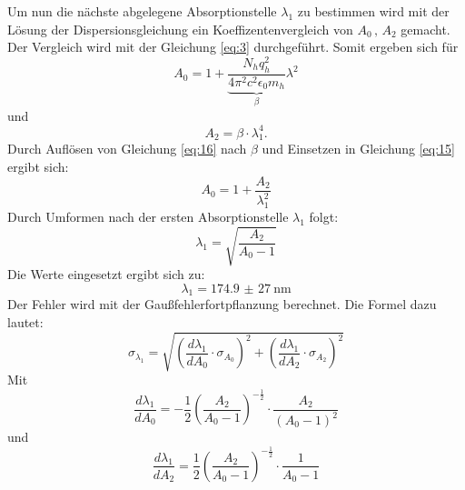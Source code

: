 Um nun die nächste abgelegene Absorptionstelle $\lambda_1$ zu bestimmen wird
mit der Lösung der Dispersionsgleichung ein Koeffizentenvergleich von $A_0 \, ,\, A_2$ gemacht.
Der Vergleich wird mit der Gleichung \ref{eq:3} durchgeführt.
Somit ergeben sich für
\begin{equation*}
  A_0 = 1 +\underbrace{\frac{N_h q_h^2}{4 \pi^2 c^2 \epsilon_0 m_h}}_\beta \lambda^2
  \label{eq:15}
\end{equation*}
und
\begin{equation*}
  A_2 = \beta \cdot \lambda_1^4.
  \label{eq:16}
\end{equation*}
Durch Auflösen von Gleichung \ref{eq:16} nach $\beta$ und Einsetzen in Gleichung \ref{eq:15} ergibt sich:
\begin{equation*}
  A_0 = 1+ \frac{A_2}{\lambda_1^2}
\end{equation*}
Durch Umformen nach der ersten Absorptionstelle $\lambda_1$ folgt:
\begin{equation*}
  \lambda_1 = \sqrt{\frac{A_2}{A_0-1}}
\end{equation*}
Die Werte eingesetzt ergibt sich zu:
\begin{equation*}
  \lambda_1 = \SI{174,9(27)}{\nano\meter}
\end{equation*}
Der Fehler wird mit der Gaußfehlerfortpflanzung berechnet.
Die Formel dazu lautet:
\begin{equation*}
  \sigma_{\lambda_1} = \sqrt{(\frac{d\lambda_1}{dA_0} \cdot \sigma_{A_0})^2 + (\frac{d\lambda_1}{dA_2} \cdot \sigma_{A_2})^2}
\end{equation*}
Mit
\begin{equation*}
  \frac{d\lambda_1}{dA_0} = -\frac{1}{2} (\frac{A_2}{A_0 -1})^{-\frac{1}{2}} \cdot \frac{A_2}{(A_0 - 1)^2}
\end{equation*}
und
\begin{equation*}
  \frac{d\lambda_1}{dA_2} = \frac{1}{2} (\frac{A_2}{A_0 -1})^{-\frac{1}{2}} \cdot \frac{1}{A_0 - 1}
\end{equation*}
